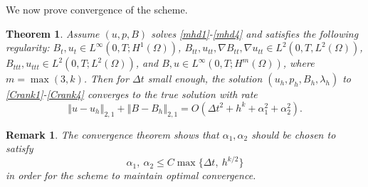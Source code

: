 \documentclass[11pt]{article}%
\numberwithin{equation}{section}
\newcommand{\norm}[1]{\left\Vert#1\right\Vert}
\newtheorem{theorem}{Theorem}[section]
\newtheorem{remark}{Remark}[section]
\begin{document}
We now prove convergence of the scheme.

\begin{theorem}
Assume $(u,p,B)$ solves \eqref{mhd1}-\eqref{mhd4} and satisfies the following regularity: $B_{t},u_{t}\in L^{\infty}(0,T;H^1(\Omega))$,
$B_{tt},u_{tt},\nabla B_{tt},\nabla u_{tt} \in L^{2}(0,T,L^2(\Omega))$,
$B_{ttt},u_{ttt}\in L^{2}(0,T;L^2(\Omega))$, and
$B,u\in L^{\infty}(0,T;H^{m}(\Omega))$, where $m=\max{(3,k)}$.  Then for $\Delta t$ small enough,
the solution  $(u_{h},p_{h},B_{h},\lambda_{h})$ to \eqref{Crank1}-\eqref{Crank4} converges to the true solution with rate
\[
\norm{ u-u_h}_{2,1} + \norm{B-B_h}_{2,1} = O(\Delta t^2 + h^k + \alpha_1^2 + \alpha_2^2).
\]
\end{theorem}

\begin{remark}
The convergence theorem shows that $\alpha_1,\alpha_2$ should be chosen to satisfy
\[
\alpha_1,\ \alpha_2 \leq C\max{ \{\Delta t,\ h^{k/2} \} }
\]
in order for the scheme to maintain optimal convergence.
\end{remark}
\end{document}
